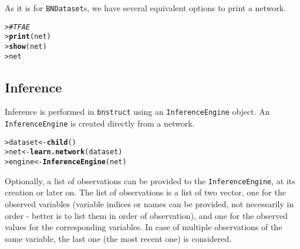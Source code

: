 \documentclass{article}\usepackage[]{graphicx}\usepackage[]{color}
\makeatletter
\newcommand{\hlcom}[1]{\textcolor[rgb]{0.678,0.584,0.686}{\textit{#1}}}%
\newcommand{\hlstd}[1]{\textcolor[rgb]{0.345,0.345,0.345}{#1}}%
\newcommand{\hlkwb}[1]{\textcolor[rgb]{0.69,0.353,0.396}{#1}}%
\newcommand{\hlkwd}[1]{\textcolor[rgb]{0.737,0.353,0.396}{\textbf{#1}}}%
\newenvironment{kframe}{%
 \def\at@end@of@kframe{}%
 \ifinner\ifhmode%
  \def\at@end@of@kframe{\end{minipage}}%
  \begin{minipage}{\columnwidth}%
 \fi\fi%
 \def\FrameCommand##1{\hskip\@totalleftmargin \hskip-\fboxsep
 \colorbox{shadecolor}{##1}\hskip-\fboxsep
     \hskip-\linewidth \hskip-\@totalleftmargin \hskip\columnwidth}%
 \MakeFramed {\advance\hsize-\width
   \@totalleftmargin\z@ \linewidth\hsize
   \@setminipage}}%
 {\par\unskip\endMakeFramed%
 \at@end@of@kframe}
\newenvironment{knitrout}{}{} %
\newcommand{\Robject}[1]{{\texttt{#1}}}
\newcommand{\Rpackage}[1]{{\texttt{#1}}}
\makeatother
\begin{document}
As it is for \Robject{BNDataset}s, we have several equivalent options to print a network.
\begin{knitrout}
\color{fgcolor}\begin{kframe}
\begin{alltt}
\hlstd{> }\hlcom{# TFAE}
\hlstd{> }\hlkwd{print}\hlstd{(net)}
\hlstd{> }\hlkwd{show}\hlstd{(net)}
\hlstd{> }\hlstd{net}
\end{alltt}
\end{kframe}
\end{knitrout}

\subsection{Inference}\label{sec:infengine}
Inference is performed in \Rpackage{bnstruct} using an \Robject{InferenceEngine} object. An \Robject{InferenceEngine}
is created directly from a network.
\begin{knitrout}
\color{fgcolor}\begin{kframe}
\begin{alltt}
\hlstd{> }\hlstd{dataset} \hlkwb{<-} \hlkwd{child}\hlstd{()}
\hlstd{> }\hlstd{net}     \hlkwb{<-} \hlkwd{learn.network}\hlstd{(dataset)}
\hlstd{> }\hlstd{engine}  \hlkwb{<-} \hlkwd{InferenceEngine}\hlstd{(net)}
\end{alltt}
\end{kframe}
\end{knitrout}

Optionally, a list of observations can be provided to the \Robject{InferenceEngine}, at its creation or later on.
The list of observations is a list of two vector, one for the observed variables
(variable indices or names can be provided, not necessarily in order - better is to list them in order of observation),
and one for the observed values for the corresponding variables. In case of multiple observations of the same variable, the last one (the most recent one) is considered.
\end{document}
